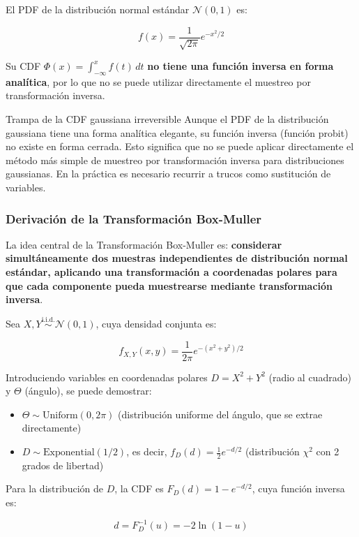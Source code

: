 El PDF de la distribución normal estándar $\mathcal{N}(0, 1)$ es:

$$f(x) = \frac{1}{\sqrt{2\pi}} e^{-x^2/2}$$

Su CDF $\Phi(x) = \int_{-\infty}^{x} f(t) \, dt$ \textbf{no tiene una función inversa en forma analítica}, por lo que no se puede utilizar directamente el muestreo por transformación inversa.

\begin{warningbox}{Trampa de la CDF gaussiana irreversible}
Aunque el PDF de la distribución gaussiana tiene una forma analítica elegante, su función inversa (función probit) no existe en forma cerrada. Esto significa que no se puede aplicar directamente el método más simple de muestreo por transformación inversa para distribuciones gaussianas. En la práctica es necesario recurrir a trucos como sustitución de variables.
\end{warningbox}

\subsubsection{Derivación de la Transformación Box-Muller}

La idea central de la Transformación Box-Muller es: \textbf{considerar simultáneamente dos muestras independientes de distribución normal estándar, aplicando una transformación a coordenadas polares para que cada componente pueda muestrearse mediante transformación inversa}.

Sea $X, Y \overset{\text{i.i.d.}}{\sim} \mathcal{N}(0, 1)$, cuya densidad conjunta es:

$$f_{X,Y}(x, y) = \frac{1}{2\pi} e^{-(x^2 + y^2)/2}$$

Introduciendo variables en coordenadas polares $D = X^2 + Y^2$ (radio al cuadrado) y $\Theta$ (ángulo), se puede demostrar:

\begin{itemize}
    \item $\Theta \sim \text{Uniform}(0, 2\pi)$ (distribución uniforme del ángulo, que se extrae directamente)
    \item $D \sim \text{Exponential}(1/2)$, es decir, $f_D(d) = \frac{1}{2}e^{-d/2}$ (distribución $\chi^2$ con 2 grados de libertad)
\end{itemize}

Para la distribución de $D$, la CDF es $F_D(d) = 1 - e^{-d/2}$, cuya función inversa es:

$$d = F_D^{-1}(u) = -2\ln(1 - u)$$

